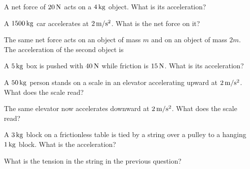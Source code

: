 \begin{exo}{}
A net force of $20\,\mathrm{N}$ acts on a $4\,\mathrm{kg}$ object. What is its acceleration?
\choices{$80\mss$}{$5\mss$}{$0.2\mss$}{$24\mss$}
\end{exo}
\begin{exo}{}
A $1500\,\mathrm{kg}$ car accelerates at $2\,\mathrm{m/s^2}$. What is the net force on it?
\choices{$750\N$}{$1502\N$}{$3000\N$}{$3\N$}
\end{exo}
\begin{exo}{}
The same net force acts on an object of mass $m$ and on an object of mass $2m$. The acceleration of the second object is
\end{exo}
\begin{exo}{}
A $5\,\mathrm{kg}$ box is pushed with $40\,\mathrm{N}$ while friction is $15\,\mathrm{N}$. What is its acceleration?
\choices{$8\mss$}{$11\mss$}{$3\mss$}{$5\mss$}
\end{exo}
\begin{exo}{}
A $50\,\mathrm{kg}$ person stands on a scale in an elevator accelerating upward at $2\,\mathrm{m/s^2}$. What does the scale read?
\choices{$400\N$}{$500\N$}{$600\N$}{$100\N$}
\end{exo}
\begin{exo}{}
The same elevator now accelerates downward at $2\,\mathrm{m/s^2}$. What does the scale read?
\end{exo}
\begin{exo}{}
A $3\,\mathrm{kg}$ block on a frictionless table is tied by a string over a pulley to a hanging $1\,\mathrm{kg}$ block. What is the acceleration?
\choices{$10\mss$}{$2.5\mss$}{$3.3\mss$}{$7.5\mss$}
\end{exo}
\begin{exo}{}
What is the tension in the string in the previous question?
\choices{$10\N$}{$2.5\N$}{$7.5\N$}{$30\N$}
\end{exo}
